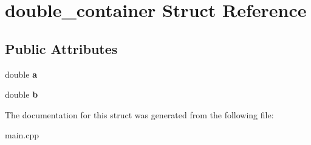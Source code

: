 \hypertarget{structdouble__container}{}\section{double\+\_\+container Struct Reference}
\label{structdouble__container}
\subsection*{Public Attributes}
\begin{DoxyCompactItemize}
\item 
\hypertarget{structdouble__container_a9fd1d983a0ea24d4728f04908c2f9d55}{}double {\bfseries a}\label{structdouble__container_a9fd1d983a0ea24d4728f04908c2f9d55}

\item 
\hypertarget{structdouble__container_af498e61611f93486e159bfd39403d968}{}double {\bfseries b}\label{structdouble__container_af498e61611f93486e159bfd39403d968}

\end{DoxyCompactItemize}


The documentation for this struct was generated from the following file\+:\begin{DoxyCompactItemize}
\item 
main.\+cpp\end{DoxyCompactItemize}

